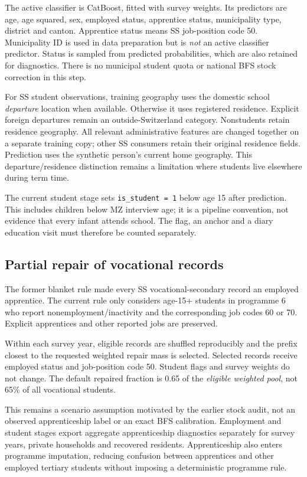 \documentclass[11pt,a4paper]{article}
\newcommand{\code}[1]{\nolinkurl{#1}}
\begin{document}
The active classifier is CatBoost, fitted with survey weights. Its predictors
are age, age squared, sex, employed status, apprentice status, municipality
type, district and canton. Apprentice status means SS job-position code 50.
Municipality ID is used in data preparation but is \emph{not} an active
classifier predictor. Status is sampled from predicted probabilities, which
are also retained for diagnostics. There is no municipal student quota or
national BFS stock correction in this step.

For SS student observations, training geography uses the domestic school
\emph{departure} location when available. Otherwise it uses registered
residence. Explicit foreign departures remain an outside-Switzerland category.
Nonstudents retain residence geography. All relevant administrative features
are changed together on a separate training copy; other SS consumers retain
their original residence fields. Prediction uses the synthetic person's
current home geography. This departure/residence distinction remains a
limitation where students live elsewhere during term time.

The current student stage sets \code{is_student = 1} below age 15 after
prediction. This includes children below MZ interview age; it is a pipeline
convention, not evidence that every infant attends school. The flag, an anchor
and a diary education visit must therefore be counted separately.

\subsection{Partial repair of vocational records}

The former blanket rule made every SS vocational-secondary record an employed
apprentice. The current rule only considers age-15+ students in programme 6
who report nonemployment/inactivity and the corresponding job codes 60 or 70.
Explicit apprentices and other reported jobs are preserved.

Within each survey year, eligible records are shuffled reproducibly and the
prefix closest to the requested weighted repair mass is selected. Selected
records receive employed status and job-position code 50. Student flags and
survey weights do not change. The default repaired fraction is 0.65 of the
\emph{eligible weighted pool}, not 65\% of all vocational students.

This remains a scenario assumption motivated by the earlier stock audit, not
an observed apprenticeship label or an exact BFS calibration. Employment and
student stages export aggregate apprenticeship diagnostics separately for
survey years, private households and recovered residents. Apprenticeship also
enters programme imputation, reducing confusion between apprentices and other
employed tertiary students without imposing a deterministic programme rule.
\end{document}

